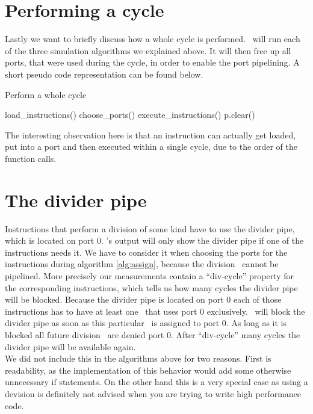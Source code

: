 \section{Performing a cycle}

Lastly we want to briefly discuss how a whole cycle is performed. \suaca\ will run each of the three simulation algorithms we explained above. It will then free up all ports, that were used during the cycle, in order to enable the port pipelining. A short pseudo code representation can be found below.

\begin{algorithm}[H]
    \SetAlgoLined
    \caption{Perform a whole cycle}
    load\_instructions()\;
    choose\_ports()\;
    execute\_instructions()\;
     {
        p.clear()\;
    }
\end{algorithm}

The interesting observation here is that an instruction can actually get loaded, put into a port and then executed within a single cycle, due to the order of the function calls.


\section{The divider pipe}
\label{sec:dividerpipe}

Instructions that perform a division of some kind have to use the divider pipe, which is located on port $0$. \suaca's output will only show the divider pipe if one of the instructions needs it. We have to consider it when choosing the ports for the instructions during algorithm \autoref{alg:assign}, because the division \microops\ cannot be pipelined. More precisely our measurements contain a ``div-cycle'' property for the corresponding instructions, which tells us how many cycles the divider pipe will be blocked. Because the divider pipe is located on port $0$ each of those instructions has to have at least one \microop\ that uses port $0$ exclusively. \suaca\ will block the divider pipe as soon as this particular \microop\ is assigned to port $0$. As long as it is blocked all future division \microops\ are denied port $0$. After ``div-cycle'' many cycles the divider pipe will be available again.\\
We did not include this in the algorithms above for two reasons. First is readability, as the implementation of this behavior would add some otherwise unnecessary if statements. On the other hand this is a very special case as using a devision is definitely not advised when you are trying to write high performance code.
